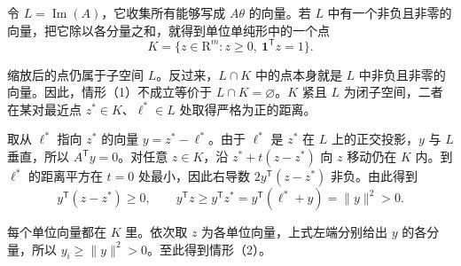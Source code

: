 \begin{tcolorbox}[knowledge]
\begin{solution}[label-content={证明},blank-type=none]
令 $L=\operatorname{Im}(A)$，它收集所有能够写成 $A\theta$ 的向量。若 $L$ 中有一个非负且非零的向量，把它除以各分量之和，就得到单位单纯形中的一个点
\[
 K=\{z\in\mathrm R^m:z\ge0,\ \mathbf1^{\mathsf T}z=1\}.
\]

缩放后的点仍属于子空间 $L$。反过来，$L\cap K$ 中的点本身就是 $L$ 中非负且非零的向量。因此，情形（1）不成立等价于 $L\cap K=\varnothing$。$K$ 紧且 $L$ 为闭子空间，二者在某对最近点 $z^*\in K$、$\ell^*\in L$ 处取得严格为正的距离。

取从 $\ell^*$ 指向 $z^*$ 的向量 $y=z^*-\ell^*$。由于 $\ell^*$ 是 $z^*$ 在 $L$ 上的正交投影，$y$ 与 $L$ 垂直，所以 $A^{\mathsf T}y=0$。对任意 $z\in K$，沿 $z^*+t(z-z^*)$ 向 $z$ 移动仍在 $K$ 内。到 $\ell^*$ 的距离平方在 $t=0$ 处最小，因此右导数 $2y^{\mathsf T}(z-z^*)$ 非负。由此得到
\[
 y^{\mathsf T}(z-z^*)\ge0,
 \qquad y^{\mathsf T}z\ge y^{\mathsf T}z^*
 =y^{\mathsf T}(\ell^*+y)=\|y\|^2>0.
\]

每个单位向量都在 $K$ 里。依次取 $z$ 为各单位向量，上式左端分别给出 $y$ 的各分量，所以 $y_i\ge\|y\|^2>0$。至此得到情形（2）。
\end{solution}
\end{tcolorbox}

